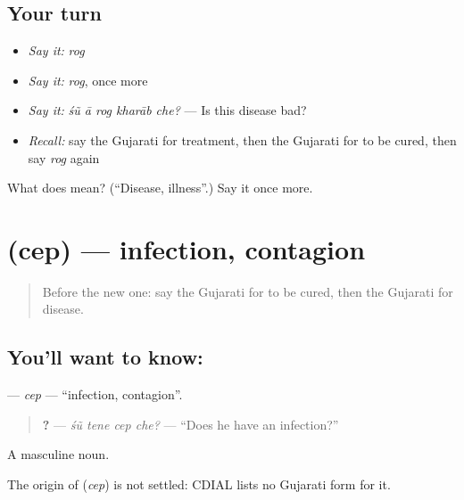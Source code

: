 \subsection*{Your turn}
\begin{itemize}
\raggedright
  \item \emph{Say it:} \emph{rog}
  \item \emph{Say it:} \emph{rog}, once more
  \item \emph{Say it:} \emph{śũ ā rog kharāb che?} — Is this disease bad?
  \item \emph{Recall:} say the Gujarati for treatment, then the Gujarati for to be cured, then say \emph{rog} again
\end{itemize}

\begin{tcolorbox}[breakable,colback=teal!4,colframe=teal!35!black,title={Before you move on}]
What does  mean? (\textquotedblleft{}Disease, illness\textquotedblright{}.) Say it once more.
\end{tcolorbox}
\section[\texorpdfstring{\gu{ચેપ} (cep)}{ચેપ (cep)}]{ (cep) — infection, contagion}

\label{lesson:GU-C232-cep}



\begin{quote}
Before the new one: say the Gujarati for to be cured, then the Gujarati for disease.
\end{quote}

\subsection*{You'll want to know: }
\textbf{} — \emph{cep} — \textquotedblleft{}infection, contagion\textquotedblright{}.

\begin{quote}
\textbf{   ?} — \emph{śũ tene cep che?} — \textquotedblleft{}Does he have an infection?\textquotedblright{}
\end{quote}

A masculine noun.

\begin{cousinweb}
The origin of \textbf{} (\emph{cep}) is not settled: CDIAL lists no Gujarati form for it.
\end{cousinweb}

